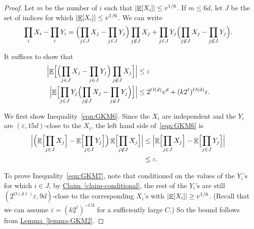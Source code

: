\documentclass[11pt]{article}
\numberwithin{equation}{section}
\theoremstyle{definition}
\theoremstyle{plain}
\newcommand{\expref}[2]{\hyperref[#2]{#1~\ref{#2}}}
\def\eps{\varepsilon}
\def\Blocklength{\ell}
\DeclarePairedDelimiter{\abs}{\lvert}{\rvert}
\DeclareMathOperator*{\E}{\mathbb{E}}                 %
\begin{document}
  \begin{proof}

    Let $m$ be the number of $i$ such that $\abs{\E[X_i]} \le v^{1/6}$.
    If $m \le 6d$, let $J$ be the set of indices for which $\abs{\E[X_i]} \le v^{1/6}$.
    We can write
    \[
      \prod_i X_i - \prod_i Y_i
      = \Bigl( \prod_{j \in J} X_j - \prod_{j \in J} Y_j \Bigr) \prod_{j \not \in J} X_j
      + \prod_{j \in J} Y_j \Bigl( \prod_{j \not \in J} X_j - \prod_{j \not \in J} Y_j \Bigr).
    \]

    It suffices to show that
    \begin{align}
      \Bigl| \E \Bigl[ \Bigl( \prod_{j \in J} X_j - \prod_{j \in J} Y_j \Bigr) \prod_{j \not \in J} X_j \Bigr] \Bigr|
      &\le \eps \label{eqn:GKM6} \\
      \Bigl| \E \Bigl[ \prod_{j \in J} Y_j \Bigl( \prod_{j \not \in J} X_j - \prod_{j \not \in J} Y_j \Bigr) \Bigr] \Bigr|
      &\le 2^{O(d)} v^d + (k 2^\Blocklength)^{O(d)} \eps . \label{eqn:GKM7}
    \end{align}

    We first show Inequality~\eqref{eqn:GKM6}.
    Since the $X_i$ are independent and the $Y_i$ are $(\eps, 15d)$-close to the $X_i$, the left hand side of~\eqref{eqn:GKM6} is
    \begin{align*}
      \Bigl| \Bigl( \E \Bigl[ \prod_{j \in J} X_j \Bigr] - \E \Bigl[ \prod_{j \in J} Y_j \Bigr] \Bigr) \E \Bigl[ \prod_{j \not \in J} X_j \Bigr] \Bigr|
      &\le \Bigl| \E \Bigl[ \prod_{j \in J} X_j \Bigr] - \E \Bigl[ \prod_{j \in J} Y_j \Bigr] \Bigr| \\
      &\le \eps.
    \end{align*}

    To prove Inequality~\eqref{eqn:GKM7}, note that conditioned on the values of the $Y_i$'s for which $i \in J$, by \expref{Claim}{claim-conditional}, the rest of the $Y_i$'s are still $(2^{O(d\Blocklength)} \eps, 9d)$-close to the corresponding $X_i$'s with $\abs{\E[X_i]} \ge v^{1/6}$.  (Recall that we can assume $\eps = (k2^\Blocklength)^{-Cd}$ for a sufficiently large $C$.)
    So the bound follows from \expref{Lemma}{lemma-GKM2}.

    \medskip


\end{proof}
\end{document}
